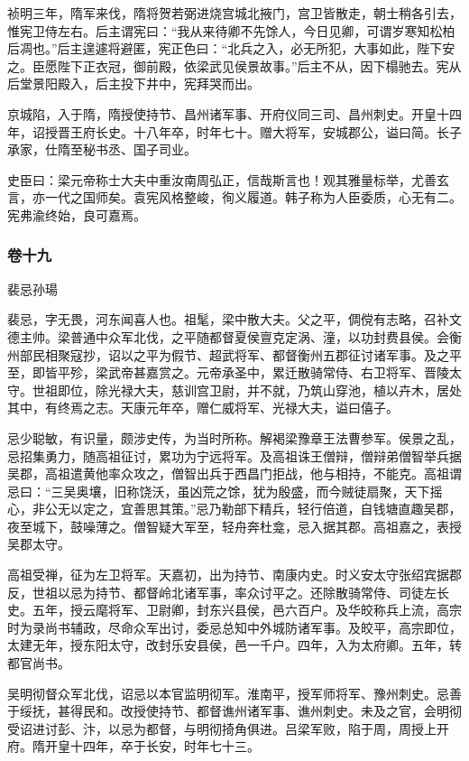 \documentclass[]{article}
\begin{document}
祯明三年，隋军来伐，隋将贺若弼进烧宫城北掖门，宫卫皆散走，朝士稍各引去，惟宪卫侍左右。后主谓宪曰：``我从来待卿不先馀人，今日见卿，可谓岁寒知松柏后凋也。''后主遑遽将避匿，宪正色曰：``北兵之入，必无所犯，大事如此，陛下安之。臣愿陛下正衣冠，御前殿，依梁武见侯景故事。''后主不从，因下榻驰去。宪从后堂景阳殿入，后主投下井中，宪拜哭而出。

京城陷，入于隋，隋授使持节、昌州诸军事、开府仪同三司、昌州刺史。开皇十四年，诏授晋王府长史。十八年卒，时年七十。赠大将军，安城郡公，谥曰简。长子承家，仕隋至秘书丞、国子司业。

史臣曰：梁元帝称士大夫中重汝南周弘正，信哉斯言也！观其雅量标举，尤善玄言，亦一代之国师矣。袁宪风格整峻，徇义履道。韩子称为人臣委质，心无有二。宪弗渝终始，良可嘉焉。

\hypertarget{header-n4753}{%
\subsubsection{卷十九}\label{header-n4753}}

裴忌孙瑒

裴忌，字无畏，河东闻喜人也。祖髦，梁中散大夫。父之平，倜傥有志略，召补文德主帅。梁普通中众军北伐，之平随都督夏侯亶克定涡、潼，以功封费县侯。会衡州部民相聚寇抄，诏以之平为假节、超武将军、都督衡州五郡征讨诸军事。及之平至，即皆平殄，梁武帝甚嘉赏之。元帝承圣中，累迁散骑常侍、右卫将军、晋陵太守。世祖即位，除光禄大夫，慈训宫卫尉，并不就，乃筑山穿池，植以卉木，居处其中，有终焉之志。天康元年卒，赠仁威将军、光禄大夫，谥曰僖子。

忌少聪敏，有识量，颇涉史传，为当时所称。解褐梁豫章王法曹参军。侯景之乱，忌招集勇力，随高祖征讨，累功为宁远将军。及高祖诛王僧辩，僧辩弟僧智举兵据吴郡，高祖遣黄他率众攻之，僧智出兵于西昌门拒战，他与相持，不能克。高祖谓忌曰：``三吴奥壤，旧称饶沃，虽凶荒之馀，犹为殷盛，而今贼徒扇聚，天下摇心，非公无以定之，宜善思其策。''忌乃勒部下精兵，轻行倍道，自钱塘直趣吴郡，夜至城下，鼓噪薄之。僧智疑大军至，轻舟奔杜龛，忌入据其郡。高祖嘉之，表授吴郡太守。

高祖受禅，征为左卫将军。天嘉初，出为持节、南康内史。时义安太守张绍宾据郡反，世祖以忌为持节、都督岭北诸军事，率众讨平之。还除散骑常侍、司徒左长史。五年，授云麾将军、卫尉卿，封东兴县侯，邑六百户。及华皎称兵上流，高宗时为录尚书辅政，尽命众军出讨，委忌总知中外城防诸军事。及皎平，高宗即位，太建无年，授东阳太守，改封乐安县侯，邑一千户。四年，入为太府卿。五年，转都官尚书。

吴明彻督众军北伐，诏忌以本官监明彻军。淮南平，授军师将军、豫州刺史。忌善于绥抚，甚得民和。改授使持节、都督谯州诸军事、谯州刺史。未及之官，会明彻受诏进讨彭、汴，以忌为都督，与明彻掎角俱进。吕梁军败，陷于周，周授上开府。隋开皇十四年，卒于长安，时年七十三。
\end{document}
